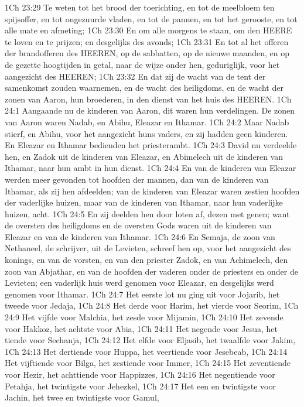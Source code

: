 1Ch 23:29  Te weten tot het brood der toerichting, en tot de meelbloem ten spijsoffer, en tot ongezuurde vladen, en tot de pannen, en tot het gerooste, en tot alle mate en afmeting;
1Ch 23:30  En om alle morgens te staan, om den HEERE te loven en te prijzen; en desgelijks des avonds;
1Ch 23:31  En tot al het offeren der brandofferen des HEEREN, op de sabbatten, op de nieuwe maanden, en op de gezette hoogtijden in getal, naar de wijze onder hen, geduriglijk, voor het aangezicht des HEEREN;
1Ch 23:32  En dat zij de wacht van de tent der samenkomst zouden waarnemen, en de wacht des heiligdoms, en de wacht der zonen van Aaron, hun broederen, in den dienst van het huis des HEEREN.
1Ch 24:1  Aangaande nu de kinderen van Aaron, dit waren hun verdelingen. De zonen van Aaron waren Nadab, en Abihu, Eleazar en Ithamar.
1Ch 24:2  Maar Nadab stierf, en Abihu, voor het aangezicht huns vaders, en zij hadden geen kinderen. En Eleazar en Ithamar bedienden het priesterambt.
1Ch 24:3  David nu verdeelde hen, en Zadok uit de kinderen van Eleazar, en Abimelech uit de kinderen van Ithamar, naar hun ambt in hun dienst.
1Ch 24:4  En van de kinderen van Eleazar werden meer gevonden tot hoofden der mannen, dan van de kinderen van Ithamar, als zij hen afdeelden; van de kinderen van Eleazar waren zestien hoofden der vaderlijke huizen, maar van de kinderen van Ithamar, naar hun vaderlijke huizen, acht.
1Ch 24:5  En zij deelden hen door loten af, dezen met genen; want de oversten des heiligdoms en de oversten Gods waren uit de kinderen van Eleazar en van de kinderen van Ithamar.
1Ch 24:6  En Semaja, de zoon van Nethaneel, de schrijver, uit de Levieten, schreef hen op, voor het aangezicht des konings, en van de vorsten, en van den priester Zadok, en van Achimelech, den zoon van Abjathar, en van de hoofden der vaderen onder de priesters en onder de Levieten; een vaderlijk huis werd genomen voor Eleazar, en desgelijks werd genomen voor Ithamar.
1Ch 24:7  Het eerste lot nu ging uit voor Jojarib, het tweede voor Jedaja,
1Ch 24:8  Het derde voor Harim, het vierde voor Seorim,
1Ch 24:9  Het vijfde voor Malchia, het zesde voor Mijamin,
1Ch 24:10  Het zevende voor Hakkoz, het achtste voor Abia,
1Ch 24:11  Het negende voor Jesua, het tiende voor Sechanja,
1Ch 24:12  Het elfde voor Eljasib, het twaalfde voor Jakim,
1Ch 24:13  Het dertiende voor Huppa, het veertiende voor Jesebeab,
1Ch 24:14  Het vijftiende voor Bilga, het zestiende voor Immer,
1Ch 24:15  Het zeventiende voor Hezir, het achttiende voor Happizzes,
1Ch 24:16  Het negentiende voor Petahja, het twintigste voor Jehezkel,
1Ch 24:17  Het een en twintigste voor Jachin, het twee en twintigste voor Gamul,
